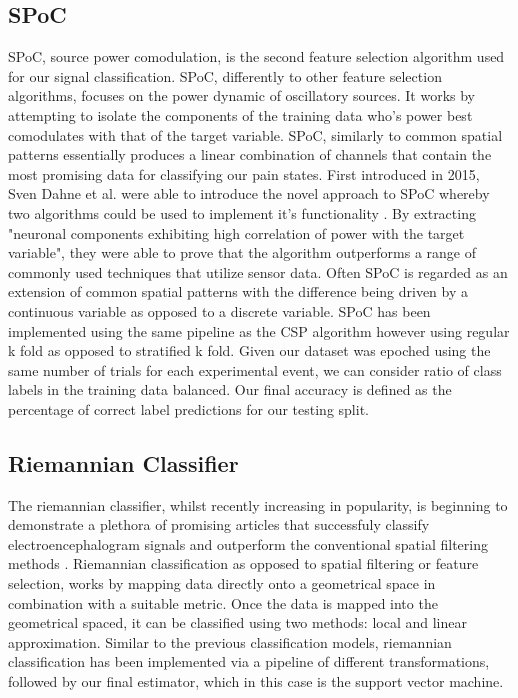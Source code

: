 \documentclass[11pt]{article}
\begin{document}
\subsection{SPoC}

SPoC, source power comodulation, is the second feature selection algorithm used for our signal classification. SPoC, differently to other feature selection algorithms, focuses on the power dynamic of oscillatory sources. It works by attempting to isolate the components of the training data who's power best comodulates with that of the target variable. SPoC, similarly to common spatial patterns essentially produces a linear combination of channels that contain the most promising data for classifying our pain states. First introduced in 2015, Sven Dahne et al. were able to introduce the novel approach to SPoC whereby two algorithms could be used to implement it's functionality \cite{DAHNE2014111}. By extracting "neuronal components exhibiting high correlation of power with the target variable", they were able to prove that the algorithm outperforms a range of commonly used techniques that utilize sensor data. Often SPoC is regarded as an extension of common spatial patterns with the difference being driven by a continuous variable as opposed to a discrete variable. SPoC has been implemented using the same pipeline as the CSP algorithm however using regular k fold as opposed to stratified k fold. Given our dataset was epoched using the same number of trials for each experimental event, we can consider ratio of class labels in the training data balanced. Our final accuracy is defined as the percentage of correct label predictions for our testing split.


\subsection{Riemannian Classifier}

The riemannian classifier, whilst recently increasing in popularity, is beginning to demonstrate a plethora of promising articles that successfuly classify electroencephalogram signals and outperform the conventional spatial filtering methods \cite{Riemannian}. Riemannian classification as opposed to spatial filtering or feature selection, works by mapping data directly onto a geometrical space in combination with a suitable metric. Once the data is mapped into the geometrical spaced, it can be classified using two methods: local and linear approximation. Similar to the previous classification models, riemannian classification has been implemented via a pipeline of different transformations, followed by our final estimator, which in this case is the support vector machine. 
\end{document}
